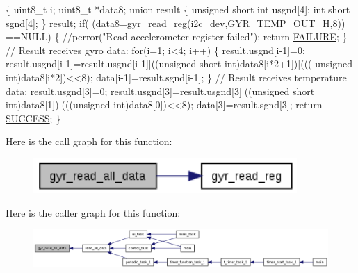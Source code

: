 \begin{DoxyCode}
\{
  uint8\_t i;
  uint8\_t *data8;
  \textcolor{keyword}{union }result
  \{
    \textcolor{keywordtype}{unsigned} \textcolor{keywordtype}{short} \textcolor{keywordtype}{int} usgnd[4];
    \textcolor{keywordtype}{int} \textcolor{keywordtype}{short} sgnd[4];
  \} result;
  \textcolor{keywordflow}{if}( (data8=\hyperlink{group__gyr_gad817a3b69d4c3026b7a9b6de32753e7b}{gyr\_read\_reg}(i2c\_dev,\hyperlink{imu__regs_8h_a7d00eaf1ea076429433ad0c787b48200}{GYR\_TEMP\_OUT\_H},8))
      ==NULL)
  \{
    \textcolor{comment}{//perror("Read accelerometer register failed");}
    \textcolor{keywordflow}{return} \hyperlink{calibration_2calibration_8h_a6d58f9ac447476b4e084d7ca383f5183}{FAILURE};
  \}
  \textcolor{comment}{// Result receives gyro data:}
  \textcolor{keywordflow}{for}(i=1; i<4; i++)
  \{
    result.usgnd[i-1]=0;
    result.usgnd[i-1]=result.usgnd[i-1]|((\textcolor{keywordtype}{unsigned} \textcolor{keywordtype}{short} int)data8[i*2+1])|(((\textcolor{keywordtype}{
      unsigned} int)data8[i*2])<<8);
    data[i-1]=result.sgnd[i-1];
  \}
  \textcolor{comment}{// Result receives temperature data:}
  result.usgnd[3]=0;
  result.usgnd[3]=result.usgnd[3]|((\textcolor{keywordtype}{unsigned} \textcolor{keywordtype}{short} int)data8[1])|(((\textcolor{keywordtype}{unsigned} 
      int)data8[0])<<8);  
  data[3]=result.sgnd[3];
  \textcolor{keywordflow}{return} \hyperlink{calibration_2calibration_8h_aa90cac659d18e8ef6294c7ae337f6b58}{SUCCESS};  
\}
\end{DoxyCode}


Here is the call graph for this function\-:
\nopagebreak
\begin{figure}[H]
\begin{center}
\leavevmode
\includegraphics[width=284pt]{group__gyr_ga79875465c3a29fd9ec77308c80a8bc37_cgraph}
\end{center}
\end{figure}




Here is the caller graph for this function\-:
\nopagebreak
\begin{figure}[H]
\begin{center}
\leavevmode
\includegraphics[width=350pt]{group__gyr_ga79875465c3a29fd9ec77308c80a8bc37_icgraph}
\end{center}
\end{figure}


